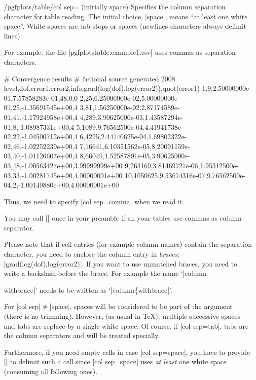 \documentclass[a4paper]{ltxdoc}
\begin{document}
\begin{key}{/pgfplots/table/col sep= (initially space)}
    Specifies the column separation character for table reading. The initial
    choice, |space|, means ``at least one white space''. White spaces are tab
    stops or spaces (newlines characters always delimit lines).

    For example, the file |pgfplotstable.example1.csv| uses commas as
    separation characters.
\begin{codeexample}
# Convergence results
# fictional source generated 2008
level,dof,error1,error2,info,{grad(log(dof),log(error2))},quot(error1)
1,9,2.50000000e-01,7.57858283e-01,48,0,0
2,25,6.25000000e-02,5.00000000e-01,25,-1.35691545e+00,4
3,81,1.56250000e-02,2.87174589e-01,41,-1.17924958e+00,4
4,289,3.90625000e-03,1.43587294e-01,8,-1.08987331e+00,4
5,1089,9.76562500e-04,4.41941738e-02,22,-1.04500712e+00,4
6,4225,2.44140625e-04,1.69802322e-02,46,-1.02252239e+00,4
7,16641,6.10351562e-05,8.20091159e-03,40,-1.01126607e+00,4
8,66049,1.52587891e-05,3.90625000e-03,48,-1.00563427e+00,3.99999999e+00
9,263169,3.81469727e-06,1.95312500e-03,33,-1.00281745e+00,4.00000001e+00
10,1050625,9.53674316e-07,9.76562500e-04,2,-1.00140880e+00,4.00000001e+00
\end{codeexample}
    Thus, we need to specify |col sep=comma| when we read it.
\begin{codeexample}[]
\end{codeexample}
    You may call || once in your preamble if
    all your tables use commas as column separator.

    Please note that if cell entries (for example column names) contain the
    separation character, you need to enclose the column entry in
    \emph{braces}: |{grad(log(dof),log(error2)}|. If you want to use unmatched
    braces, you need to write a backslash before the brace. For example the
    name `|column{withbrace|' needs to be written as `|column\{withbrace|'.

    For |col sep|$\neq$|space|, spaces will be considered to be part of the
    argument (there is no trimming). However, (as usual in \TeX{}), multiple
    successive spaces and tabs are replace by a single white space. Of course,
    if |col sep=tab|, tabs are the column separators and will be treated
    specially.

    Furthermore, if you need empty cells in case |col sep=space|, you have to
    provide |{}| to delimit such a cell since |col sep=space| uses \emph{at
    least} one white space (consuming all following ones).

}
\end{key}
\end{document}
